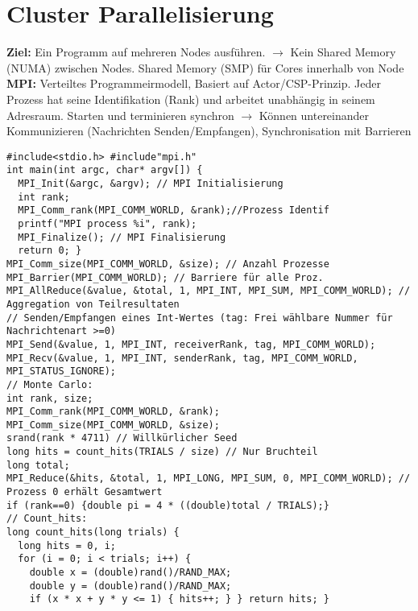 
\section{Cluster Parallelisierung}
\textcolor{b}{\textbf{Ziel:}} Ein Programm auf mehreren Nodes ausführen. $\rightarrow$ Kein Shared Memory (NUMA) zwischen Nodes. Shared Memory (SMP) für Cores innerhalb von Node\\
\textcolor{b}{\textbf{MPI:}} Verteiltes Programmeirmodell, Basiert auf Actor/CSP-Prinzip. Jeder Prozess hat seine Identifikation (Rank) und arbeitet unabhängig in seinem Adresraum. Starten und terminieren synchron $\rightarrow$ Können untereinander Kommunizieren (Nachrichten Senden/Empfangen), Synchronisation mit Barrieren
\begin{lstlisting}
#include<stdio.h> #include"mpi.h"
int main(int argc, char* argv[]) {
  MPI_Init(&argc, &argv); // MPI Initialisierung
  int rank;
  MPI_Comm_rank(MPI_COMM_WORLD, &rank);//Prozess Identif
  printf("MPI process %i", rank);
  MPI_Finalize(); // MPI Finalisierung
  return 0; }
MPI_Comm_size(MPI_COMM_WORLD, &size); // Anzahl Prozesse
MPI_Barrier(MPI_COMM_WORLD); // Barriere für alle Proz.
MPI_AllReduce(&value, &total, 1, MPI_INT, MPI_SUM, MPI_COMM_WORLD); // Aggregation von Teilresultaten
// Senden/Empfangen eines Int-Wertes (tag: Frei wählbare Nummer für Nachrichtenart >=0)
MPI_Send(&value, 1, MPI_INT, receiverRank, tag, MPI_COMM_WORLD);
MPI_Recv(&value, 1, MPI_INT, senderRank, tag, MPI_COMM_WORLD, MPI_STATUS_IGNORE);
// Monte Carlo:
int rank, size;
MPI_Comm_rank(MPI_COMM_WORLD, &rank);
MPI_Comm_size(MPI_COMM_WORLD, &size);
srand(rank * 4711) // Willkürlicher Seed
long hits = count_hits(TRIALS / size) // Nur Bruchteil
long total;
MPI_Reduce(&hits, &total, 1, MPI_LONG, MPI_SUM, 0, MPI_COMM_WORLD); // Prozess 0 erhält Gesamtwert
if (rank==0) {double pi = 4 * ((double)total / TRIALS);}
// Count_hits:
long count_hits(long trials) {
  long hits = 0, i;
  for (i = 0; i < trials; i++) {
    double x = (double)rand()/RAND_MAX;
    double y = (double)rand()/RAND_MAX;
    if (x * x + y * y <= 1) { hits++; } } return hits; }
\end{lstlisting}